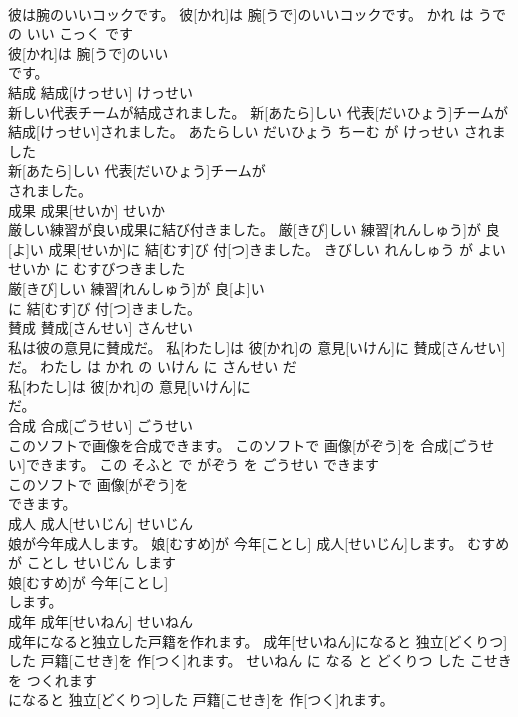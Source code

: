 \documentclass[8pt]{extreport}
\begin{document}
\begin{CJK}{UTF8}{min}
\\	彼は腕のいいコックです。	彼[かれ]は 腕[うで]のいいコックです。	かれ は うで の いい こっく です	
\\	彼[かれ]は 腕[うで]のいい
\\	です。			
\\	結成	結成[けっせい]	けっせい	
\\	新しい代表チームが結成されました。	新[あたら]しい 代表[だいひょう]チームが 結成[けっせい]されました。	あたらしい だいひょう ちーむ が けっせい されました	
\\	新[あたら]しい 代表[だいひょう]チームが
\\	されました。			
\\	成果	成果[せいか]	せいか	
\\	厳しい練習が良い成果に結び付きました。	厳[きび]しい 練習[れんしゅう]が 良[よ]い 成果[せいか]に 結[むす]び 付[つ]きました。	きびしい れんしゅう が よい せいか に むすびつきました	
\\	厳[きび]しい 練習[れんしゅう]が 良[よ]い
\\	に 結[むす]び 付[つ]きました。			
\\	賛成	賛成[さんせい]	さんせい	
\\	私は彼の意見に賛成だ。	私[わたし]は 彼[かれ]の 意見[いけん]に 賛成[さんせい]だ。	わたし は かれ の いけん に さんせい だ	
\\	私[わたし]は 彼[かれ]の 意見[いけん]に
\\	だ。			
\\	合成	合成[ごうせい]	ごうせい	
\\	このソフトで画像を合成できます。	このソフトで 画像[がぞう]を 合成[ごうせい]できます。	この そふと で がぞう を ごうせい できます	
\\	このソフトで 画像[がぞう]を
\\	できます。			
\\	成人	成人[せいじん]	せいじん	
\\	娘が今年成人します。	娘[むすめ]が 今年[ことし] 成人[せいじん]します。	むすめ が ことし せいじん します	
\\	娘[むすめ]が 今年[ことし]
\\	します。			
\\	成年	成年[せいねん]	せいねん	
\\	成年になると独立した戸籍を作れます。	成年[せいねん]になると 独立[どくりつ]した 戸籍[こせき]を 作[つく]れます。	せいねん に なる と どくりつ した こせき を つくれます	
\\	になると 独立[どくりつ]した 戸籍[こせき]を 作[つく]れます。			

\end{CJK}
\end{document}
